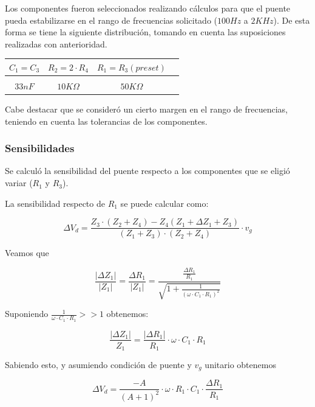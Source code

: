 Los componentes fueron seleccionados realizando c\'alculos para que el puente pueda estabilizarse en el rango de frecuencias solicitado ($100Hz$ a $2KHz$). De esta forma se tiene la siguiente distribuci\'on, tomando en cuenta las suposiciones realizadas con anterioridad.

\begin{table}[H]
    \centering
    \begin{tabular}{c c c c}
        $C_1 = C_3$ & $R_2 = 2 \cdot R_4$ & $R_1 = R_3 (preset)$ \\
        \hline \\
        $33 nF$ & $10 K\Omega$ & $50 K\Omega$ \\
        \hline
    \end{tabular}
\end{table}

Cabe destacar que se consider\'o un cierto margen en el rango de frecuencias, teniendo en cuenta las tolerancias de los componentes.



\subsubsection{Sensibilidades}
Se calcul\'o la sensibilidad del puente respecto a los componentes que se eligi\'o variar ($R_1$ y $R_3$).

La sensibilidad respecto de $R_1$ se puede calcular como:

\begin{equation}
\Delta V_d = \frac{Z_3 \cdot (Z_2+Z_4) - Z_4(Z_1 + \Delta Z_1 + Z_3)}{(Z_1+Z_3) \cdot (Z_2+Z_4)} \cdot v_g
\end{equation}
 
Veamos que

\begin{equation}
\frac{|\Delta Z_1|}{|Z_1|} = \frac{\Delta R_1}{|Z_1|} = \frac{\frac{\Delta R_1}{R_1}}{\sqrt{1+\frac{1}{(\omega \cdot C_1 \cdot R_1)^2}}}
\end{equation}

Suponiendo $\frac{1}{\omega \cdot C_1 \cdot R_1} >> 1$ obtenemos:

\begin{equation}
\frac{|\Delta Z_1|}{Z_1} = \frac{|\Delta R_1|}{R_1} \cdot \omega \cdot C_1 \cdot R_1
\end{equation}


Sabiendo esto, y asumiendo condici\'on de puente y $v_g$ unitario obtenemos

\begin{equation}
\Delta V_d = \frac{-A}{(A+1)^2} \cdot \omega \cdot R_1 \cdot C_1 \cdot \frac{\Delta R_1}{R_1}
\end{equation}

